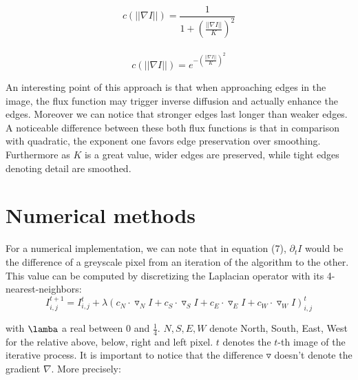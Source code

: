 \documentclass{article}
\begin{document}
\begin{equation}c(||\nabla I||) = \frac{1}{1+\left(\frac{||\nabla I||}{K}\right)^2}\end{equation}\\
\begin{equation}c(||\nabla I||) = e^{-\left(\frac{||\nabla I||}{K}\right)^2}\end{equation}

An interesting point of this approach is that when approaching edges in the image, the flux function may trigger inverse diffusion and actually enhance the edges. Moreover we can notice that stronger edges last longer than weaker edges. A noticeable difference between these both flux functions is that in comparison with quadratic, the exponent one favors edge preservation over smoothing. Furthermore as $K$ is a great value, wider edges are preserved, while tight edges denoting detail are smoothed. %


\section{Numerical methods}

For a numerical implementation, we can note that in equation (7), $\partial_t I$ would be the difference of a greyscale pixel from an iteration of the algorithm to the other. This value can be computed by discretizing the Laplacian operator with its 4-nearest-neighbors: \begin{equation}I_{i,j}^{t+1}=I_{i,j}^t + \lambda(c_N \cdot \triangledown_N I + c_S \cdot \triangledown_S I + c_E \cdot \triangledown_E I + c_W \cdot \triangledown_W I)_{i,j}^t\end{equation}

with $\lamba$ a real between 0 and $\frac{1}{4}$. $N, S, E, W$ denote North, South, East, West for the relative above, below, right and left pixel. $t$ denotes the $t$-th image of the iterative process. It is important to notice that the difference $\triangledown$ doesn't denote the gradient $\nabla$. More precisely:
\end{document}
